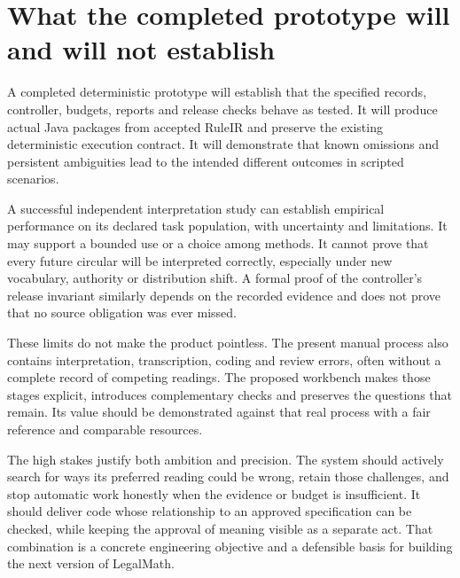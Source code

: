 \section{What the completed prototype will and will not establish}

A completed deterministic prototype will establish that the specified records,
controller, budgets, reports and release checks behave as tested. It will produce
actual Java packages from accepted RuleIR and preserve the existing deterministic
execution contract. It will demonstrate that known omissions and persistent
ambiguities lead to the intended different outcomes in scripted scenarios.

A successful independent interpretation study can establish empirical performance
on its declared task population, with uncertainty and limitations. It may support
a bounded use or a choice among methods. It cannot prove that every future
circular will be interpreted correctly, especially under new vocabulary,
authority or distribution shift. A formal proof of the controller's release
invariant similarly depends on the recorded evidence and does not prove that no
source obligation was ever missed.

These limits do not make the product pointless. The present manual process also
contains interpretation, transcription, coding and review errors, often without a
complete record of competing readings. The proposed workbench makes those stages
explicit, introduces complementary checks and preserves the questions that remain.
Its value should be demonstrated against that real process with a fair reference
and comparable resources.

The high stakes justify both ambition and precision. The system should actively
search for ways its preferred reading could be wrong, retain those challenges,
and stop automatic work honestly when the evidence or budget is insufficient.
It should deliver code whose relationship to an approved specification can be
checked, while keeping the approval of meaning visible as a separate act.
That combination is a concrete engineering objective and a defensible basis for
building the next version of LegalMath.

